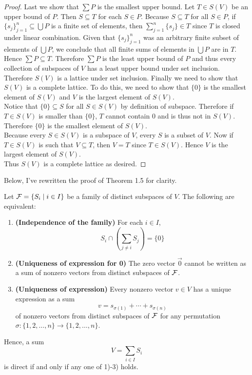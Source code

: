 \begin{proof}
Last we show that $\sum P$ is the smallest upper bound. Let $T\in S(V)$ be an upper bound of $P$. Then $S\subseteq T$ for each $S\in P$. Because $S\subseteq T$ for all $S\in P$, if $\{s_j\}_{j=1}^n\subseteq\bigcup P$ is a finite set of elements, then $\sum_{j=1}^n\{s_j\}\in T$ since $T$ is closed under linear combination. Given that $\{s_j\}_{j=1}^n$ was an arbitrary finite subset of elements of $\bigcup P$, we conclude that all finite sums of elements in $\bigcup P$ are in $T$. Hence $\sum P\subseteq T$. Therefore $\sum P$ is the least upper bound of $P$ and thus every collection of subspaces of $V$ has a least upper bound under set inclusion.\\

Therefore $S(V)$ is a lattice under set inclusion. Finally we need to show that $S(V)$ is a complete lattice. To do this, we need to show that $\{0\}$ is the smallest element of $S(V)$ and $V$ is the largest element of $S(V)$. \\

Notice that $\{0\}\subseteq S$ for all $S\in S(V)$ by definition of subspace. Therefore if $T\in S(V)$ is smaller than $\{0\}$, $T$ cannot contain 0 and is thus not in $S(V)$. Therefore $\{0\}$ is the smallest element of $S(V)$.\\

Because every $S\in S(V)$ is a subspace of $V$, every $S$ is a subset of $V$. Now if $T\in S(V)$ is such that $V\subseteq T$, then $V=T$ since $T\in S(V)$. Hence $V$ is the largest element of $S(V)$.\\

Thus $S(V)$ is a complete lattice as desired.
\end{proof}

Below, I've rewritten the proof of Theorem 1.5 for clarity.

\begin{theorem}
Let ${\mathcal{F}}=\{S_i\mid i\in I\}$ be a family of distinct subspaces of $V$. The following are equivalent:
\begin{enumerate}[label=\textit{\arabic*)}]
	\item \textbf{(Independence of the family)} For each $i\in I$,
	\[
		S_i\cap\left(\sum_{j\neq i} S_j\right)=\{0\}	
	\]
	
	\item \textbf{(Uniqueness of expression for 0)} The zero vector $\vec{0}$ cannot be written as a sum of nonzero vectors from distinct subspaces of ${\mathcal{F}}$.
	
	\item \textbf{(Uniqueness of expression)} Every nonzero vector $v\in V$ has a unique expression as a sum
	\[
		v = s_{\sigma(1)} + \cdots + s_{\sigma(n)}	
	\]
	of nonzero vectors from distinct subspaces of ${\mathcal{F}}$ for any permutation $\sigma\colon\{1,2,\ldots,n\}\rightarrow\{1,2,\ldots,n\}$.
\end{enumerate}
Hence, a sum
\[
	V = \sum_{i\in I} S_i
\]
is direct if and only if any one of 1)-3) holds.
\end{theorem}

